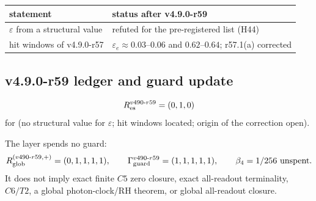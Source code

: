 \begin{center}
\small
\begin{tabular}{@{}>{\raggedright\arraybackslash}p{}>{\raggedright\arraybackslash}p{}@{}}
\toprule
statement & status after v4.9.0-r59\\
\midrule
\(\varepsilon\) from a structural value & refuted for the pre-registered list (H44)\\
hit windows of v4.9.0-r57 & \(\varepsilon_e\approx0.03\)--\(0.06\) and \(0.62\)--\(0.64\); r57.1(a) corrected\\
\bottomrule
\end{tabular}
\end{center}

\subsection*{v4.9.0-r59 ledger and guard update}
\label{subsec:v490-r59-ledger-guard}

\[
R_{\rm es}^{v490\text{-}r59}=(0,1,0)
\]
for (no structural value for \(\varepsilon\); hit windows located; origin of the correction open).

The layer spends no guard:
\[
R_{\rm glob}^{(v490\text{-}r59,+)}=(0,1,1,1,1),
\qquad
\Gamma_{\rm guard}^{v490\text{-}r59}=(1,1,1,1,1),
\qquad
\beta_4=1/256\ \text{unspent}.
\]
It does not imply exact finite \(C5\) zero closure, exact all-readout terminality,
\(C6/T2\), a global photon-clock/RH theorem, or global all-readout closure.
